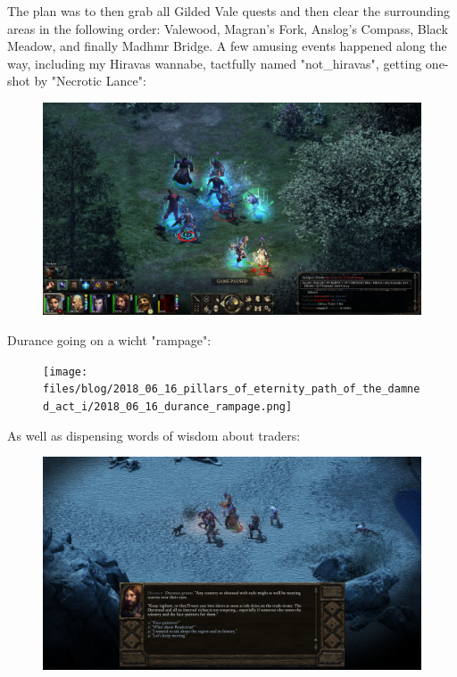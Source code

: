 \documentclass{article}
\begin{document}
The plan was to then grab all Gilded Vale quests and then clear the surrounding areas in the following order: Valewood, Magran's Fork, Anslog's Compass, Black Meadow, and finally Madhmr Bridge.  A few amusing events happened along the way, including my Hiravas wannabe, tactfully named "not_hiravas", getting one-shot by "Necrotic Lance":

\begin{figure}
\includegraphics[scale=0.33]{files/blog/2018_06_16_pillars_of_eternity_path_of_the_damned_act_i/2018_06_16_hiravas_oneshot.jpg}
\end{figure}

Durance going on a wicht "rampage":

\begin{figure}
\texttt{[image: files/blog/2018\_06\_16\_pillars\_of\_eternity\_path\_of\_the\_damned\_act\_i/2018\_06\_16\_durance\_rampage.png]}
\end{figure}

As well as dispensing words of wisdom about traders:

\begin{figure}
\includegraphics[scale=0.33]{files/blog/2018_06_16_pillars_of_eternity_path_of_the_damned_act_i/2018_06_16_durance_wisdom.jpg}
\end{figure}
\end{document}
